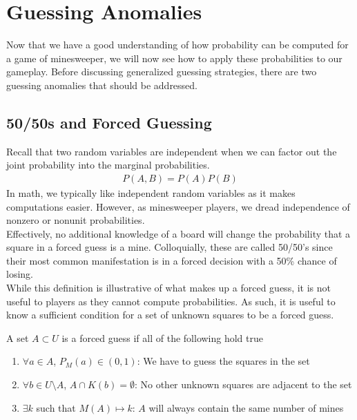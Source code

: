 \section{Guessing Anomalies}
Now that we have a good understanding of how probability can be computed for a game of minesweeper, we will now see how to apply these probabilities to our gameplay. Before discussing generalized guessing strategies, there are two guessing anomalies that should be addressed.\\

\subsection{50/50s and Forced Guessing}
Recall that two random variables are independent when we can factor out the joint probability into the marginal probabilities.\begin{align*}
    P(A,B)=P(A)P(B)
\end{align*}
In math, we typically like independent random variables as it makes computations easier. However, as minesweeper players, we dread independence of nonzero or nonunit probabilities.\\

Effectively, no additional knowledge of a board will change the probability that a square in a forced guess is a mine. Colloquially, these are called 50/50's since their most common manifestation is in a forced decision with a 50\% chance of losing.\\

While this definition is illustrative of what makes up a forced guess, it is not useful to players as they cannot compute probabilities. As such, it is useful to know a sufficient condition for a set of unknown squares to be a forced guess.
\begin{proposition}
A set $A\subset U$ is a forced guess if all of the following hold true\begin{enumerate}
    \item $\forall a\in A$, $P_M(a)\in(0,1)$: We have to guess the squares in the set
    \item $\forall b\in U\setminus A$, $A\cap K(b)=\emptyset$: No other unknown squares are adjacent to the set
    \item $\exists k$ such that $M(A)\mapsto k$: $A$ will always contain the same number of mines
\end{enumerate}
\end{proposition}

